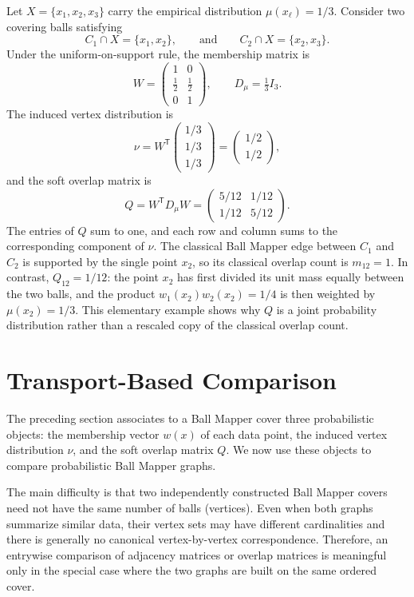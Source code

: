 \documentclass[9pt,a4paper,twocolumn,twoside]{extarticle}
\theoremstyle{definition}
\begin{document}
Let $X=\{x_1,x_2,x_3\}$ carry the empirical distribution $\mu(x_\ell)=1/3$.  Consider two covering balls satisfying
\[
  C_1\cap X=\{x_1,x_2\},
  \qquad\text{and}\qquad
  C_2\cap X=\{x_2,x_3\}.
\]
Under the uniform-on-support rule, the membership matrix is
\[
  W=
  \begin{pmatrix}
    1 & 0\\
    \tfrac12 & \tfrac12\\
    0 & 1
  \end{pmatrix},
  \qquad
  D_\mu=\tfrac13 I_3.
\]
The induced vertex distribution is
\[
  \nu=W^{\mathsf T}
  \begin{pmatrix}
    1/3\\[1mm]1/3\\[1mm]1/3
  \end{pmatrix}
  =
  \begin{pmatrix}
    1/2\\[1mm]1/2
  \end{pmatrix},
\]
and the soft overlap matrix is
\[
  Q=W^{\mathsf T}D_\mu W
  =
  \begin{pmatrix}
    5/12 & 1/12\\[1mm]
    1/12 & 5/12
  \end{pmatrix}.
\]
The entries of $Q$ sum to one, and each row and column sums to the corresponding component of $\nu$. The classical Ball Mapper edge between $C_1$ and $C_2$ is supported by the single point $x_2$, so its classical overlap count is $m_{12}=1$.  In contrast, $Q_{12}=1/12$: the point $x_2$ has first divided its unit mass equally between the two balls, and the product $w_1(x_2)w_2(x_2)=1/4$ is then weighted by $\mu(x_2)=1/3$. This elementary example shows why $Q$ is a joint probability distribution rather than a rescaled copy of the classical overlap count.

\section{Transport-Based Comparison}

The preceding section associates to a Ball Mapper cover three probabilistic objects: the membership vector $w(x)$ of each data point, the induced vertex distribution $\nu$, and the soft overlap matrix $Q$. We now use these objects to compare probabilistic Ball Mapper graphs.

The main difficulty is that two independently constructed Ball Mapper covers need not have the same number of balls (vertices). Even when both graphs summarize similar data, their vertex sets may have different cardinalities and there is generally no canonical vertex-by-vertex correspondence. Therefore, an entrywise comparison of adjacency matrices or overlap matrices is meaningful only in the special case where the two graphs are built on the same ordered cover.
\end{document}
